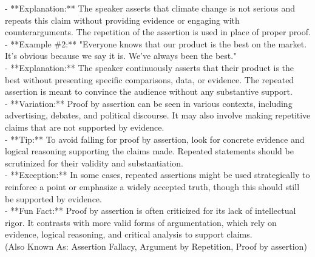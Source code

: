 \documentclass[a4paper,12pt,single,pdftex]{scrartcl}
\begin{document}
{    
      - **Explanation:** The speaker asserts that climate change is not serious and repeats this claim without providing evidence or engaging with counterarguments. The repetition of the assertion is used in place of proper proof.
    \\

    
      - **Example \#2:** "Everyone knows that our product is the best on the market. It’s obvious because we say it is. We’ve always been the best."
    \\

    
      - **Explanation:** The speaker continuously asserts that their product is the best without presenting specific comparisons, data, or evidence. The repeated assertion is meant to convince the audience without any substantive support.
    \\

    
      - **Variation:** Proof by assertion can be seen in various contexts, including advertising, debates, and political discourse. It may also involve making repetitive claims that are not supported by evidence.
    \\

    
      - **Tip:** To avoid falling for proof by assertion, look for concrete evidence and logical reasoning supporting the claims made. Repeated statements should be scrutinized for their validity and substantiation.
    \\

    
      - **Exception:** In some cases, repeated assertions might be used strategically to reinforce a point or emphasize a widely accepted truth, though this should still be supported by evidence.
    \\

    
      - **Fun Fact:** Proof by assertion is often criticized for its lack of intellectual rigor. It contrasts with more valid forms of argumentation, which rely on evidence, logical reasoning, and critical analysis to support claims.
    \\

  
    
      (Also Known As: Assertion Fallacy, Argument by Repetition, Proof by assertion)
    \\

  }
\end{document}
